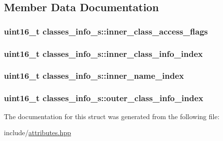 \subsection{Member Data Documentation}
\hypertarget{structclasses__info__s_a821ed8a4eabdf77102409c67bb0d519f}{
\subsubsection[{inner\+\_\+class\+\_\+access\+\_\+flags}]{\setlength{\rightskip}{0pt plus 5cm}uint16\+\_\+t classes\+\_\+info\+\_\+s\+::inner\+\_\+class\+\_\+access\+\_\+flags}}\label{structclasses__info__s_a821ed8a4eabdf77102409c67bb0d519f}
\hypertarget{structclasses__info__s_ae8c45ace1c34dd137289f54f5d5704c3}{
\subsubsection[{inner\+\_\+class\+\_\+info\+\_\+index}]{\setlength{\rightskip}{0pt plus 5cm}uint16\+\_\+t classes\+\_\+info\+\_\+s\+::inner\+\_\+class\+\_\+info\+\_\+index}}\label{structclasses__info__s_ae8c45ace1c34dd137289f54f5d5704c3}
\hypertarget{structclasses__info__s_ac33145154cb1f0db33d90e02800b00bb}{
\subsubsection[{inner\+\_\+name\+\_\+index}]{\setlength{\rightskip}{0pt plus 5cm}uint16\+\_\+t classes\+\_\+info\+\_\+s\+::inner\+\_\+name\+\_\+index}}\label{structclasses__info__s_ac33145154cb1f0db33d90e02800b00bb}
\hypertarget{structclasses__info__s_a25b561f15295b3ea0d55932ee4f00260}{
\subsubsection[{outer\+\_\+class\+\_\+info\+\_\+index}]{\setlength{\rightskip}{0pt plus 5cm}uint16\+\_\+t classes\+\_\+info\+\_\+s\+::outer\+\_\+class\+\_\+info\+\_\+index}}\label{structclasses__info__s_a25b561f15295b3ea0d55932ee4f00260}


The documentation for this struct was generated from the following file\+:\begin{DoxyCompactItemize}
\item 
include/\hyperlink{attributes_8hpp}{attributes.\+hpp}\end{DoxyCompactItemize}
